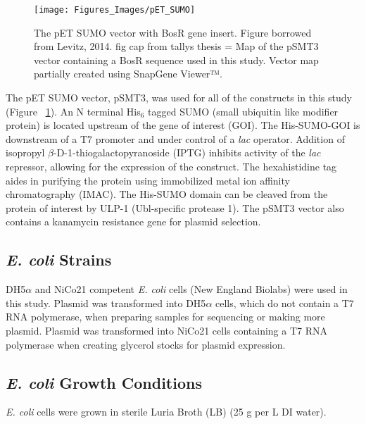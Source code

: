 \documentclass[12pt,twoside]{reedthesis}
\begin{document}
   	\begin{figure}[h]
   		
   		\centering
   		\texttt{[image: Figures\_Images/pET\_SUMO]}
   		\caption[pET SUMO Vector with BosR Insert]{The pET SUMO vector with BosR gene insert. Figure borrowed from Levitz, 2014. fig cap from tallys thesis = Map of the pSMT3 vector containing a BosR sequence used in this study.
   			Vector map partially created using SnapGene Viewer™.}
   		\label{pETSUMOBosR}
   	\end{figure}
   	
   The pET SUMO vector, pSMT3, was used for all of the constructs in this study (Figure ~\ref{pETSUMOBosR}). An N terminal His$_{6}$ tagged SUMO (small ubiquitin like modifier protein) is located upstream of the gene of interest (GOI). The His-SUMO-GOI is downstream of a T7 promoter and  under control of a \textit{lac} operator. Addition of isopropyl $\beta$-D-1-thiogalactopyranoside (IPTG) inhibits activity of the \textit{lac} repressor, allowing for the expression of the construct. The hexahistidine tag aides in purifying the protein using immobilized metal ion affinity chromatography (IMAC). The His-SUMO domain can be cleaved from the protein of interest by ULP-1 (Ubl-specific protease 1). The pSMT3 vector also contains a kanamycin resistance gene for plasmid selection. 
   
   \subsection*{\textit{E. coli} Strains}
   
   DH5$\alpha$ and NiCo21 competent \textit{E. coli} cells (New England Biolabs) were used in this study. Plasmid was transformed into DH5$\alpha$ cells, which do not contain a T7 RNA polymerase, when preparing samples for sequencing or making more plasmid. Plasmid was transformed into NiCo21 cells containing a T7 RNA polymerase when creating glycerol stocks for plasmid expression. 
   
   \subsection*{\textit{E. coli} Growth Conditions}
   \textit{E. coli} cells were grown in sterile Luria  Broth (LB) (25 g per L DI water). 
   
\end{document}
